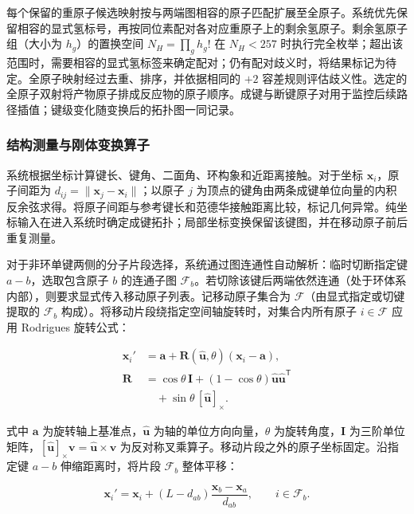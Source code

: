 每个保留的重原子候选映射按与两端图相容的原子匹配扩展至全原子。系统优先保留相容的显式氢标号，再按同位素配对各对应重原子上的剩余氢原子。剩余氢原子组（大小为 $h_g$）的置换空间 $N_H=\prod_g h_g!$ 在 $N_H<257$ 时执行完全枚举；超出该范围时，需要相容的显式氢标签来确定配对；仍有配对歧义时，将结果标记为待定。全原子映射经过去重、排序，并依据相同的 $+2$ 容差规则评估歧义性。选定的全原子双射将产物原子排成反应物的原子顺序。成键与断键原子对用于监控后续路径插值；键级变化随变换后的拓扑图一同记录。

\subsubsection{结构测量与刚体变换算子}
系统根据坐标计算键长、键角、二面角、环构象和近距离接触。对于坐标 $\mathbf{x}_i$，原子间距为 $d_{ij}=\|\mathbf{x}_j-\mathbf{x}_i\|$；以原子 $j$ 为顶点的键角由两条成键单位向量的内积反余弦求得。将原子间距与参考键长和范德华接触距离比较，标记几何异常。纯坐标输入在进入系统时确定成键拓扑；局部坐标变换保留该键图，并在移动原子前后重复测量。

对于非环单键两侧的分子片段选择，系统通过图连通性自动解析：临时切断指定键 $a-b$，选取包含原子 $b$ 的连通子图 $\mathcal{F}_b$。若切除该键后两端依然连通（处于环体系内部），则要求显式传入移动原子列表。记移动原子集合为 $\mathcal{F}$（由显式指定或切键提取的 $\mathcal{F}_b$ 构成）。将移动片段绕指定空间轴旋转时，对集合内所有原子 $i\in\mathcal{F}$ 应用 Rodrigues 旋转公式：

\begin{equation}\label{eq:methods-02}
\begin{aligned}
\mathbf{x}_i'&=\mathbf{a}+\mathbf{R}(\hat{\mathbf{u}},\theta)(\mathbf{x}_i-\mathbf{a}),\\
\mathbf{R}&=\cos\theta\,\mathbf{I}+(1-\cos\theta)\hat{\mathbf{u}}\hat{\mathbf{u}}^{\mathsf{T}}\\
&\quad+\sin\theta\,[\hat{\mathbf{u}}]_\times.
\end{aligned}
\end{equation}

式中 $\mathbf{a}$ 为旋转轴上基准点，$\hat{\mathbf{u}}$ 为轴的单位方向向量，$\theta$ 为旋转角度，$\mathbf{I}$ 为三阶单位矩阵，$[\hat{\mathbf{u}}]_\times\mathbf{v}=\hat{\mathbf{u}}\times\mathbf{v}$ 为反对称叉乘算子。移动片段之外的原子坐标固定。沿指定键 $a-b$ 伸缩距离时，将片段 $\mathcal{F}_b$ 整体平移：

\begin{equation}\label{eq:methods-03}
\mathbf{x}_i'=\mathbf{x}_i+(L-d_{ab})\frac{\mathbf{x}_b-\mathbf{x}_a}{d_{ab}},\qquad i\in\mathcal{F}_b.
\end{equation}

